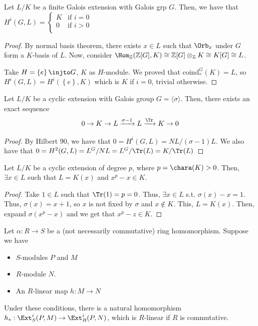 \documentclass[12pt]{scrartcl}
\begin{document}
\begin{theorem}
	Let $L/K$ be a finite Galois extension with Galois grp $G$.
	Then, we have that $H^i(G, L) = 
\begin{cases}
	K & \text{if } i = 0 \\
0 & \text{if } i>0 \\
\end{cases}
	$ 
\end{theorem}
\begin{proof}
By normal basis theorem, there exists $x \in L$ such that $\Orb_x$ under $G$ form a $K$-basis of $L$.
Now, consider $\Hom_{\mathbb{Z}}(\mathbb{Z}[G], K) \cong \mathbb{Z}[G] \otimes_{\mathbb{Z}} K \cong  K[G] \cong L$. 

Take $H = \left\{e\right\} \injto G$, $K$ as $H$-module.
We proved that $\textrm{coind}_{*}^G(K) = L$, so $H^i(G, L) = H^i(\left\{e\right\}, K)$ which is $K$ if $i=0$, trivial otherwise.  
\end{proof}

\begin{corollary}
Let $L/K$ be a cyclic extension with Galois group $G = \langle \sigma\rangle$.
Then, there exists an exact sequence 
\[
	0 \to K \to L \xrightarrow{\sigma-1} L \xrightarrow{\Tr} K \to 0
\]
\end{corollary}

\begin{proof}
By Hilbert 90, we have that $0 = H^i(G, L) = NL/(\sigma-1)L$.
We also have that $0 = H^2(G, L) = L^G/NL = L^G/\Tr(L) = K/\Tr(L)$ 
\end{proof}

\begin{corollary}
Let $L/K$ be a cyclic extension of degree $p$, where $p = \chara(K) >0$.
Then, $\exists x \in L$ such that $L = K(x)$ and $x^p - x \in K$.   
\end{corollary}
\begin{proof}
Take $1 \in L$ such that $\Tr(1) = p = 0$.
Thus, $\exists x \in L$ s.t. $\sigma(x) - x = 1$.
Thus, $\sigma(x) = x+ 1$, so $x$ is not fixed by $\sigma$ and $x  \not \in K$.
This, $L = K(x)$.
Then, expand $\sigma(x^p - x)$ and we get that $x^p - z \in K$. 
\end{proof}
 
Let $\alpha: R \to S$ be a (not necessarily commutative) ring homomorphism.
Suppose we have 
\begin{itemize}
	\item $S$-modules $P$ and $M$
	\item $R$-module $N$.
	\item An $R$-linear map $h: M \to N$   
\end{itemize}
\begin{theorem}
Under these conditions, there is a natural homomorphism $h_{*}: \Ext_S^i(P, M) \to \Ext_R^i(P, N)$, which is $R$-linear if $R$ is commutative.
\end{theorem}
\end{document}
